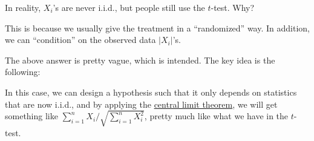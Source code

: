 \begin{problem*}
	In reality, \(X_i\)'s are never i.i.d., but people still use the \(t\)-test. Why?
\end{problem*}
\begin{answer}
	This is because we usually give the treatment in a ``randomized'' way. In addition, we can ``condition'' on the observed data \(\vert X_i \vert \)'s.
\end{answer}

The above answer is pretty vague, which is intended. The key idea is the following:

\begin{intuition}
	In this case, we can design a hypothesis such that it only depends on statistics that are now i.i.d., and by applying the \hyperref[thm:CLT]{central limit theorem}, we will get something like \(\sum_{i=1}^{n} X_i / \sqrt{\sum_{i=1}^{n} X_i^2} \), pretty much like what we have in the \(t\)-test.
\end{intuition}